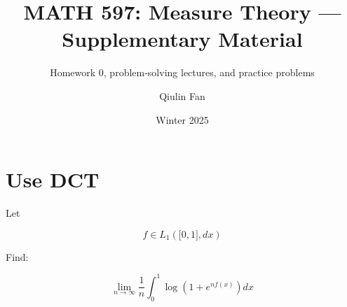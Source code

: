 \documentclass{qlnotes-export}
\title{MATH 597: Measure Theory --- Supplementary Material}
\subtitle{Homework 0, problem-solving lectures, and practice problems}
\author{Qiulin Fan}
\date{Winter 2025}
\begin{document}
\mainmatter
\chapter{Use DCT}\label{use-dct}

Let

\[f \in L_{1}(\lbrack 0,1\rbrack,dx)\]

Find:

\[\lim\limits_{n\rightarrow\infty}\frac{1}{n}\int_{0}^{1}\log\left( {1 + e^{nf(x)}} \right)dx\]
\end{document}
